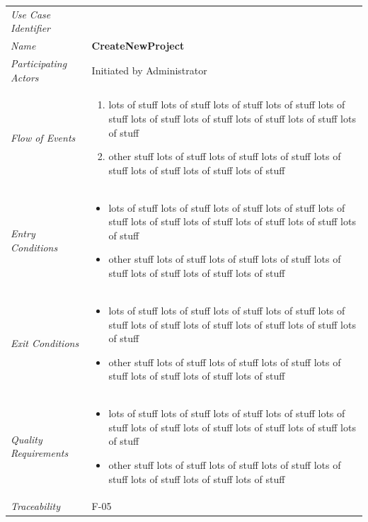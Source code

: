 \documentclass[12pt,letterpaper]{article}
\begin{document}
\begin{center}
	\begin{tabu} to 
		\toprule
		Use Case Identifier & \createnewproject{} \\
		Name & {\bf CreateNewProject} \\
		Participating Actors & Initiated by Administrator \\
		Flow of Events & 
	    \begin{enumerate}[topsep=-1em]
		    \item lots of stuff lots of stuff lots of stuff lots of stuff lots of stuff lots of stuff lots of stuff lots of stuff lots of stuff lots of stuff
		    \item other stuff lots of stuff lots of stuff lots of stuff lots of stuff lots of stuff lots of stuff lots of stuff
		\end{enumerate} \\

		Entry Conditions &
		\begin{itemize}[topsep=-1em]
		    \item lots of stuff lots of stuff lots of stuff lots of stuff lots of stuff lots of stuff lots of stuff lots of stuff lots of stuff lots of stuff
		    \item other stuff lots of stuff lots of stuff lots of stuff lots of stuff lots of stuff lots of stuff lots of stuff
        \end{itemize} \\

		Exit Conditions &
		\begin{itemize}[topsep=-1em]
		    \item lots of stuff lots of stuff lots of stuff lots of stuff lots of stuff lots of stuff lots of stuff lots of stuff lots of stuff lots of stuff
		    \item other stuff lots of stuff lots of stuff lots of stuff lots of stuff lots of stuff lots of stuff lots of stuff
        \end{itemize} \\

		Quality Requirements &
		\begin{itemize}[topsep=-1em]
		    \item lots of stuff lots of stuff lots of stuff lots of stuff lots of stuff lots of stuff lots of stuff lots of stuff lots of stuff lots of stuff
		    \item other stuff lots of stuff lots of stuff lots of stuff lots of stuff lots of stuff lots of stuff lots of stuff
        \end{itemize} \\

		Traceability & F-05 \\
		\toprule
	\end{tabu}
\end{center}
\end{document}
